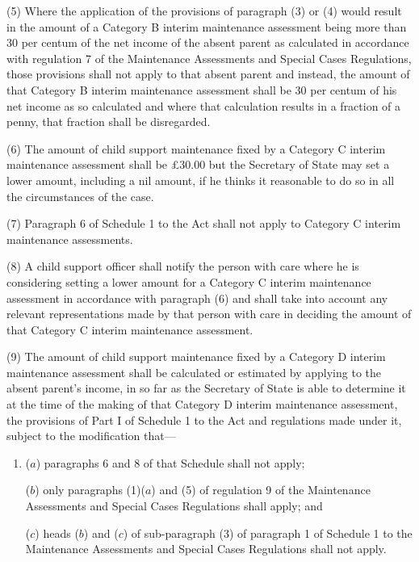\documentclass[a4paper,12pt]{article}
\begin{document}
(5) Where the application of the provisions of paragraph (3) or (4) would result in the amount of a Category B interim maintenance assessment being more than 30 per centum of the net income of the absent parent as calculated in accordance with regulation 7 of the Maintenance Assessments and Special Cases Regulations, those provisions shall not apply to that absent parent and instead, the amount of that Category B interim maintenance assessment shall be 30 per centum of his net income as so calculated and where that calculation results in a fraction of a penny, that fraction shall be disregarded.

(6) The amount of child support maintenance fixed by a Category C interim maintenance assessment shall be £30$.$00 but 
the Secretary of State  %
may set a lower amount, including a nil amount, if he thinks it reasonable to do so in all the circumstances of the case.

(7) Paragraph 6 of Schedule 1 to the Act shall not apply to Category C interim maintenance assessments.

(8) A child support officer shall notify the person with care where he is considering setting a lower amount for a Category C interim maintenance assessment in accordance with paragraph (6) and shall take into account any relevant representations made by that person with care in deciding the amount of that Category C interim maintenance assessment.

(9) The amount of child support maintenance fixed by a Category D interim maintenance assessment shall be calculated or estimated by applying to the absent parent’s income, in so far as 
the Secretary of State  %
is able to determine it at the time of the making of that Category D interim maintenance assessment, the provisions of Part I of Schedule 1 to the Act and regulations made under it, subject to the modification that—
\begin{enumerate}\item[]
($a$) paragraphs 6 and 8 of that Schedule shall not apply;

($b$) only paragraphs (1)($a$) and (5) of regulation 9 of the Maintenance Assessments and Special Cases Regulations shall apply; and

($c$) heads ($b$) and ($c$) of sub-paragraph (3) of paragraph 1 of Schedule 1 to the Maintenance Assessments and Special Cases Regulations shall not apply.
\end{enumerate}
\end{document}
